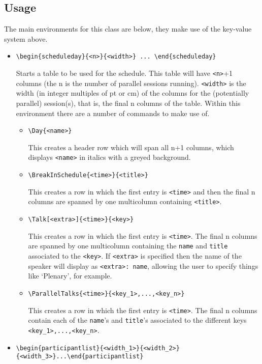 \documentclass{amsart}
\begin{document}
\subsection{Usage} The main environments for this class are below, they make use of the key-value system above.
\begin{itemize}
    \item \verb|\begin{scheduleday}{<n>}{<width>} ... \end{scheduleday}|

    Starts a table to be used for the schedule.  This table will have \verb|<n>|+1 columns (the n is the number of parallel sessions running).  \verb|<width>| is the width (in integer multiples of pt or cm) of the columns for the (potentially parallel) session(s), that is, the final n columns of the table.  Within this environment there are a number of commands to make use of.
    \begin{itemize}
        \item \verb|\Day{<name>}| 

        This creates a header row which will span all n+1 columns, which displays \verb|<name>| in italics with a greyed background.
        \item \verb|\BreakInSchedule{<time>}{<title>}|

        This creates a row in which the first entry is \verb|<time>| and then the final n columns are spanned by one multicolumn containing \verb|<title>|.
        \item \verb|\Talk[<extra>]{<time>}{<key>}|

        This creates a row in which the first entry is \verb|<time>|.  The  final n columns are spanned by one multicolumn containing the \verb|name| and \verb|title| associated to the \verb|<key>|.  If \verb|<extra>| is specified then the name of the speaker will display as \verb|<extra>: name|, allowing the user to specify things like `Plenary', for example.

        \item \verb|\ParallelTalks{<time>}{<key_1>,...,<key_n>}|

        This creates a row in which the first entry is \verb|<time>|.  The  final n columns contain each of the \verb|name|'s and \verb|title|'s associated to the different keys \verb|<key_1>,...,<key_n>|.
    \end{itemize}
    \item \verb|\begin{participantlist}{<width_1>}{<width_2>}{<width_3>}...\end{participantlist}|


\end{itemize}
\end{document}
